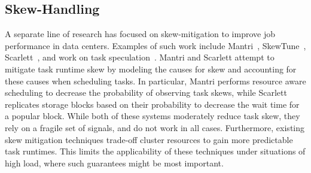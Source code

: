\subsection{Skew-Handling}
A separate line of research has focused on skew-mitigation to improve job
performance in data centers. Examples of such work include
Mantri~\cite{ananthanarayanan2010reining}, SkewTune~\cite{kwon2012skewtune},
Scarlett~\cite{ananthanarayanan2011scarlett}, and work on task
speculation~\cite{zaharia2008improving}. Mantri and Scarlett attempt to
mitigate task runtime skew by modeling the causes for skew and accounting for
these causes when scheduling tasks. In particular, Mantri performs resource aware scheduling to decrease the
probability of observing task skews, while Scarlett replicates storage blocks
based on their probability to decrease the wait time for a popular block. While
both of these systems moderately reduce task skew, they rely on a fragile set of
signals, and do not work in all cases.
Furthermore, existing skew mitigation techniques trade-off cluster resources to
gain more predictable task runtimes. This limits the applicability of these
techniques under situations of high load, where such guarantees might be most
important.

